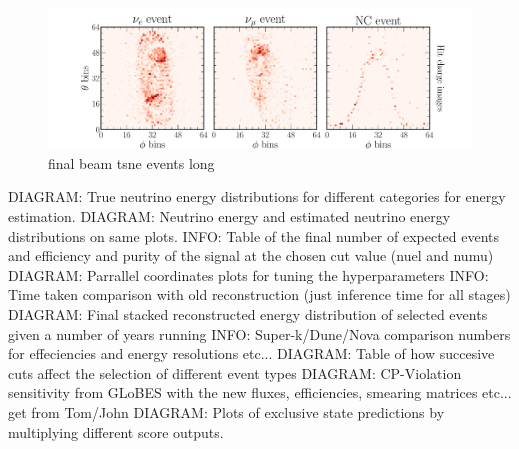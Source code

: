 \begin{figure} %
    \includegraphics[width=\textwidth]{diagrams/7-cvn/chipsnet/final_beam_tsne_events.pdf}
    \caption[final beam tsne events short]
    {final beam tsne events long}
    \label{fig:final_beam_tsne_events}
\end{figure} %

DIAGRAM: True neutrino energy distributions for different categories for energy estimation.
DIAGRAM: Neutrino energy and estimated neutrino energy distributions on same plots.
INFO: Table of the final number of expected events and efficiency and purity of the signal at the chosen cut value (nuel and numu)
DIAGRAM: Parrallel coordinates plots for tuning the hyperparameters
INFO: Time taken comparison with old reconstruction (just inference time for all stages)
DIAGRAM: Final stacked reconstructed energy distribution of selected events given a number of years running
INFO: Super-k/Dune/Nova comparison numbers for effeciencies and energy resolutions etc...
DIAGRAM: Table of how succesive cuts affect the selection of different event types
DIAGRAM: CP-Violation sensitivity from GLoBES with the new fluxes, efficiencies, smearing matrices etc... get from Tom/John
DIAGRAM: Plots of exclusive state predictions by multiplying different score outputs.


